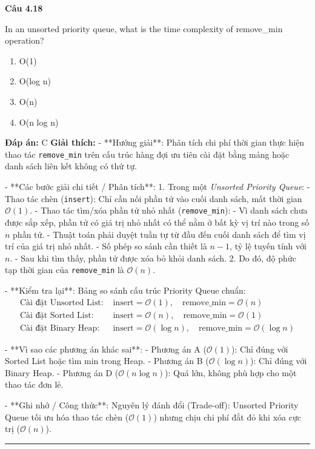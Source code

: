 \documentclass[11pt,a4paper]{article}
\newenvironment{question}[1]{%
  \par\vspace{1em}\noindent\textbf{\large Câu #1}\par\vspace{0.4em}
}{%
  \par\vspace{1em}\hrule\vspace{0.6em}
}
\newenvironment{choices}{%
  \begin{enumerate}[label=\textbf{\Alph*.},leftmargin=2.2em,itemsep=2pt,topsep=3pt]
}{%
  \end{enumerate}
}
\newcommand{\choice}{\item}
\begin{document}
\begin{question}{4.18}
In an unsorted priority queue, what is the time complexity of remove_min operation?
\begin{choices}
\choice O(1)
\choice O(log n)
\choice O(n)
\choice O(n log n)
\end{choices}
\textbf{Đáp án:} C
\textbf{Giải thích:} - **Hướng giải**:
Phân tích chi phí thời gian thực hiện thao tác \texttt{remove\_min} trên cấu trúc hàng đợi ưu tiên cài đặt bằng mảng hoặc danh sách liên kết không có thứ tự.


- **Các bước giải chi tiết / Phân tích**:
1. Trong một \textit{Unsorted Priority Queue}:
   - Thao tác chèn (\texttt{insert}): Chỉ cần nối phần tử vào cuối danh sách, mất thời gian \(\mathcal{O}(1)\).
   - Thao tác tìm/xóa phần tử nhỏ nhất (\texttt{remove\_min}):
     - Vì danh sách chưa được sắp xếp, phần tử có giá trị nhỏ nhất có thể nằm ở bất kỳ vị trí nào trong số \(n\) phần tử.
     - Thuật toán phải duyệt tuần tự từ đầu đến cuối danh sách để tìm vị trí của giá trị nhỏ nhất.
     - Số phép so sánh cần thiết là \(n - 1\), tỷ lệ tuyến tính với \(n\).
     - Sau khi tìm thấy, phần tử được xóa bỏ khỏi danh sách.
2. Do đó, độ phức tạp thời gian của \texttt{remove\_min} là \(\mathcal{O}(n)\).


- **Kiểm tra lại**:
Bảng so sánh cấu trúc Priority Queue chuẩn:
\[\begin{aligned}
\text{Cài đặt Unsorted List: } & \text{insert} = \mathcal{O}(1), \quad \text{remove\_min} = \mathcal{O}(n) \\
\text{Cài đặt Sorted List: } & \text{insert} = \mathcal{O}(n), \quad \text{remove\_min} = \mathcal{O}(1) \\
\text{Cài đặt Binary Heap: } & \text{insert} = \mathcal{O}(\log n), \quad \text{remove\_min} = \mathcal{O}(\log n)
\end{aligned}\]


- **Vì sao các phương án khác sai**:
- Phương án A (\(\mathcal{O}(1)\)): Chỉ đúng với Sorted List hoặc tìm min trong Heap.
- Phương án B (\(\mathcal{O}(\log n)\)): Chỉ đúng với Binary Heap.
- Phương án D (\(\mathcal{O}(n \log n)\)): Quá lớn, không phù hợp cho một thao tác đơn lẻ.


- **Ghi nhớ / Công thức**:
Nguyên lý đánh đổi (Trade-off): Unsorted Priority Queue tối ưu hóa thao tác chèn (\(\mathcal{O}(1)\)) nhưng chịu chi phí đắt đỏ khi xóa cực trị (\(\mathcal{O}(n)\)).
\end{question}
\end{document}
